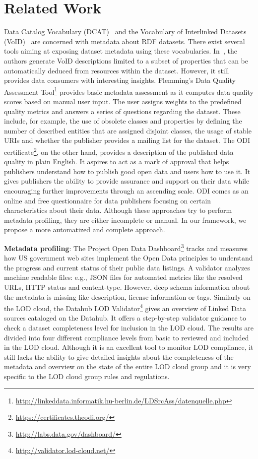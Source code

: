 \section{Related Work}
\label{section:roomba-related-work}
Data Catalog Vocabulary (DCAT)~\cite{Erickson:DCV:14} and the Vocabulary of Interlinked Datasets (VoID)~\cite{Cyganiak:W3C:11} are concerned with metadata about RDF datasets. There exist several tools aiming at exposing dataset metadata using these vocabularies. In~\cite{Bohm:WebSemJournal:11}, the authors generate VoID descriptions limited to a subset of properties that can be automatically deduced from resources within the dataset. However, it still provides data consumers with interesting insights. Flemming's Data Quality Assessment Tool\footnote{\url{http://linkeddata.informatik.hu-berlin.de/LDSrcAss/datenquelle.php}} provides basic metadata assessment as it computes data quality scores based on manual user input. The user assigns weights to the predefined quality metrics and answers a series of questions regarding the dataset. These include, for example, the use of obsolete classes and properties by defining the number of described entities that are assigned disjoint classes, the usage of stable URIs and whether the publisher provides a mailing list for the dataset. The ODI certificate\footnote{\url{https://certificates.theodi.org/}}, on the other hand, provides a description of the published data quality in plain English. It aspires to act as a mark of approval that helps publishers understand how to publish good open data and users how to use it. It gives publishers the ability to provide assurance and support on their data while encouraging further improvements through an ascending scale. ODI comes as an online and free questionnaire for data publishers focusing on certain characteristics about their data. Although these approaches try to perform metadata profiling, they are either incomplete or manual. In our framework, we propose a more automatized and complete approach.

\textbf{Metadata profiling}: The Project Open Data Dashboard\footnote{\url{http://labs.data.gov/dashboard/}} tracks and measures how US government web sites implement the Open Data principles to understand the progress and current status of their public data listings. A validator analyzes machine readable files: e.g., JSON files for automated metrics like the resolved URLs, HTTP status and content-type. However, deep schema information about the metadata is missing like description, license information or tags. Similarly on the LOD cloud, the Datahub LOD Validator\footnote{\url{http://validator.lod-cloud.net/}} gives an overview of Linked Data sources cataloged on the Datahub. It offers a step-by-step validator guidance to check a dataset completeness level for inclusion in the LOD cloud. The results are divided into four different compliance levels from basic to reviewed and included in the LOD cloud. Although it is an excellent tool to monitor LOD compliance, it still lacks the ability to give detailed insights about the completeness of the metadata and overview on the state of the entire LOD cloud group and it is very specific to the LOD cloud group rules and regulations.

